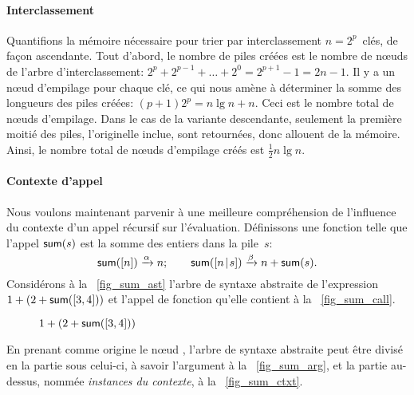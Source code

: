 \paragraph{Interclassement}

Quantifions la mémoire nécessaire pour trier par interclassement
\(n=2^p\)~clés, de façon ascendante. Tout d'abord, le nombre de piles
créées est le nombre de n{\oe}uds de l'arbre d'interclassement: \(2^p
+ 2^{p-1} + \ldots + 2^0 = 2^{p+1}-1 = 2n - 1\). Il y a un n{\oe}ud
d'empilage pour chaque clé, ce qui nous
amène à déterminer la somme des longueurs des piles créées: \((p+1)2^p
= n\lg n + n\). Ceci est le nombre total de n{\oe}uds d'empilage. Dans
le cas de la variante descendante, seulement la première moitié des
piles, l'originelle inclue, sont retournées, donc allouent de la
mémoire. Ainsi, le nombre total de n{\oe}uds d'empilage créés est
\(\tfrac{1}{2}n\lg n\).


\paragraph{Contexte d'appel}

Nous voulons maintenant parvenir à une meilleure compréhension de
l'influence du contexte d'un appel récursif sur
l'évaluation. Définissons une fonction  telle que l'appel
\(\textsf{sum}(s)\) est la somme des entiers dans la pile~\(s\):
\begin{equation*}
\textsf{sum}([n]) \xrightarrow{\smash{\alpha}} n;\qquad
\textsf{sum}([{n}\!\mid\!{s}]) \xrightarrow{\smash{\beta}} n + \textsf{sum}(s).
\end{equation*}
Considérons à la \fig~\vref{fig_sum_ast} l'arbre de syntaxe abstraite
de l'expression \(1+(2+\textsf{sum}([3,4]))\) et l'appel de fonction
qu'elle contient à la \fig~\ref{fig_sum_call}.
\begin{figure}
\centering
{}
\qquad
{}
\quad
{}
\qquad
{}
\caption{\(1+(2+\textsf{sum}([3,4]))\)}
\end{figure}
En prenant comme origine le n{\oe}ud , l'arbre de syntaxe
abstraite peut être divisé en la partie sous celui-ci, à savoir
l'argument à la \fig~\ref{fig_sum_arg}, et la partie au-dessus, nommée
\emph{instances du contexte}, à la \fig~\ref{fig_sum_ctxt}.

